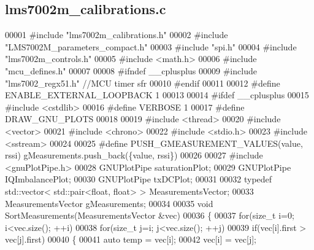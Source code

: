 \subsection{lms7002m\+\_\+calibrations.\+c}
\label{lms7002m__calibrations_8c_source}

\begin{DoxyCode}
00001 \textcolor{preprocessor}{#include "lms7002m_calibrations.h"}
00002 \textcolor{preprocessor}{#include "LMS7002M_parameters_compact.h"}
00003 \textcolor{preprocessor}{#include "spi.h"}
00004 \textcolor{preprocessor}{#include "lms7002m_controls.h"}
00005 \textcolor{preprocessor}{#include <math.h>}
00006 \textcolor{preprocessor}{#include "mcu_defines.h"}
00007 
00008 \textcolor{preprocessor}{#ifndef \_\_cplusplus}
00009 \textcolor{preprocessor}{#include "lms7002\_regx51.h"} \textcolor{comment}{//MCU timer sfr}
00010 \textcolor{preprocessor}{#endif}
00011 
00012 \textcolor{preprocessor}{#define ENABLE\_EXTERNAL\_LOOPBACK 1}
00013 
00014 \textcolor{preprocessor}{#ifdef \_\_cplusplus}
00015 \textcolor{preprocessor}{#include <cstdlib>}
00016 \textcolor{preprocessor}{#define VERBOSE 1}
00017 \textcolor{preprocessor}{#define DRAW\_GNU\_PLOTS}
00018 
00019 \textcolor{preprocessor}{#include <thread>}
00020 \textcolor{preprocessor}{#include <vector>}
00021 \textcolor{preprocessor}{#include <chrono>}
00022 \textcolor{preprocessor}{#include <stdio.h>}
00023 \textcolor{preprocessor}{#include <sstream>}
00024 
00025 \textcolor{preprocessor}{#define PUSH\_GMEASUREMENT\_VALUES(value, rssi) gMeasurements.push\_back(\{value, rssi\})}
00026 
00027 \textcolor{preprocessor}{#include <gnuPlotPipe.h>}
00028 GNUPlotPipe saturationPlot;
00029 GNUPlotPipe IQImbalancePlot;
00030 GNUPlotPipe txDCPlot;
00031 
00032 \textcolor{keyword}{typedef} std::vector< std::pair<float, float> > MeasurementsVector;
00033 MeasurementsVector gMeasurements;
00034 
00035 \textcolor{keywordtype}{void} SortMeasurements(MeasurementsVector &vec)
00036 \{
00037     \textcolor{keywordflow}{for}(\textcolor{keywordtype}{size\_t} i=0; i<vec.size(); ++i)
00038         \textcolor{keywordflow}{for}(\textcolor{keywordtype}{size\_t} j=i; j<vec.size(); ++j)
00039             \textcolor{keywordflow}{if}(vec[i].first > vec[j].first)
00040             \{
00041                 \textcolor{keyword}{auto} temp = vec[i];
00042                 vec[i] = vec[j];

\end{DoxyCode}
